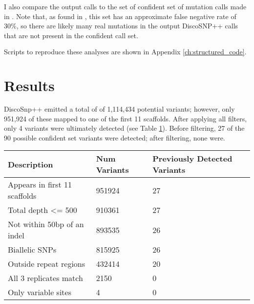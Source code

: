 I also compare the output calls to the set of confident set of mutation calls made in \textcite{orr_phylogenomic_2020}. Note that, as found in \textcite{orr_phylogenomic_2020}, this set has an approximate false negative rate of 30\%, so there are likely many real mutations in the output DiscoSNP++ calls that are not present in the confident call set.

Scripts to reproduce these analyses are shown in Appendix \ref{ch:structured_code}.

\section{Results}

DiscoSnp++ emitted a total of of 1,114,434 potential variants; however, only 951,924 of these mapped to one of the first 11 scaffolds. After applying all filters, only 4 variants were ultimately detected (see Table \ref{tbl:ev_num_variants}). Before filtering, 27 of the 90 possible confident set variants were detected; after filtering, none were.

\begin{table}
\begin{tabularx}{\textwidth}{X X X}
\toprule
\textbf{Description} & \textbf{Num \newline Variants} & \textbf{Previously Detected Variants}\\
\midrule
Appears in first 11 scaffolds & 951924 & 27\\
Total depth <= 500 & 910361 & 27\\
Not within 50bp of an indel & 893535 & 26\\
Biallelic SNPs & 815925 & 26\\
Outside repeat regions & 432414 & 20\\
All 3 replicates match & 2150 & 0\\
Only variable sites & 4 & 0\\
\bottomrule
\end{tabularx}
\label{tbl:ev_num_variants}
\end{table}

